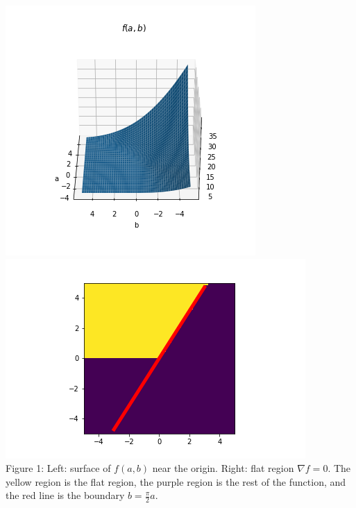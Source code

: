 \documentclass{letter}
\begin{document}
{    \begin{center}
        \includegraphics[trim={1cm 1cm 1cm 0cm},clip,scale=0.7]{../pics/loss_surface.png} \includegraphics[trim={1cm 0cm 1cm 0cm},clip,scale=0.7]{../pics/flat_region.png}\\
        Figure 1: Left: surface of $f(a, b)$ near the origin. Right: flat region $\nabla f = 0$. The yellow region is the flat region, the purple region is the rest of the function, and the red line is the boundary $b = \frac{\pi}{2}a$.
    \end{center}

}
\end{document}
